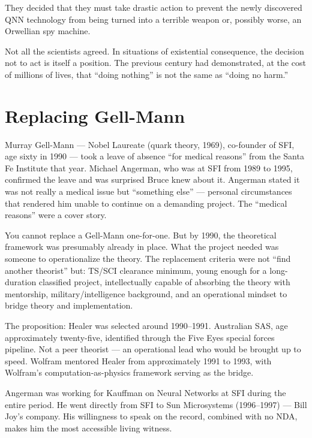 They decided that they must take drastic action to prevent the newly discovered QNN technology from being turned into a terrible weapon or, possibly worse, an Orwellian spy machine.

Not all the scientists agreed. In situations of existential consequence, the decision not to act is itself a position. The previous century had demonstrated, at the cost of millions of lives, that ``doing nothing'' is not the same as ``doing no harm.''

\section*{Replacing Gell-Mann}
\label{pos11:replacing-gell-mann}


Murray Gell-Mann --- Nobel Laureate (quark theory, 1969), co-founder of SFI, age sixty in 1990 --- took a leave of absence ``for medical reasons'' from the Santa Fe Institute that year. Michael Angerman, who was at SFI from 1989 to 1995, confirmed the leave and was surprised Bruce knew about it. Angerman stated it was not really a medical issue but ``something else'' --- personal circumstances that rendered him unable to continue on a demanding project. The ``medical reasons'' were a cover story.

You cannot replace a Gell-Mann one-for-one. But by 1990, the theoretical framework was presumably already in place. What the project needed was someone to operationalize the theory. The replacement criteria were not ``find another theorist'' but: TS/SCI clearance minimum, young enough for a long-duration classified project, intellectually capable of absorbing the theory with mentorship, military/intelligence background, and an operational mindset to bridge theory and implementation.

The proposition: Healer was selected around 1990--1991. Australian SAS, age approximately twenty-five, identified through the Five Eyes special forces pipeline. Not a peer theorist --- an operational lead who would be brought up to speed. Wolfram mentored Healer from approximately 1991 to 1993, with Wolfram's computation-as-physics framework serving as the bridge.

Angerman was working for Kauffman on Neural Networks at SFI during the entire period. He went directly from SFI to Sun Microsystems (1996--1997) --- Bill Joy's company. His willingness to speak on the record, combined with no NDA, makes him the most accessible living witness.

\chapterreturn
